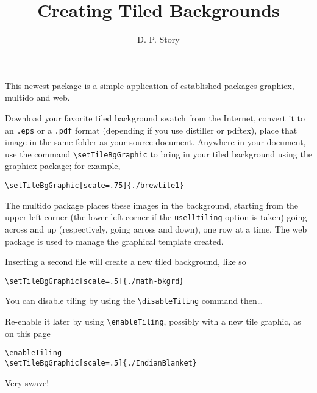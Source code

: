 \documentclass{article}
\title{Creating Tiled Backgrounds}
\author{D. P. Story}
\begin{document}
\maketitle


This newest package is a simple application of established packages
\textsf{graphicx}, \textsf{multido} and \textsf{web}.

Download your favorite tiled background swatch from the Internet,
convert it to an \texttt{.eps} or a \texttt{.pdf} format (depending
if you use \textsf{distiller} or \textsf{pdftex}), place that image
in the same folder as your source document. Anywhere in your
document, use the command \verb!\setTileBgGraphic! to bring in your
tiled background using the \textsf{graphicx} package; for example,
\begin{verbatim}
\setTileBgGraphic[scale=.75]{./brewtile1}
\end{verbatim}
The \textsf{multido} package places these images in the background,
starting from the upper-left corner (the lower left corner if the
\texttt{uselltiling} option is taken) going across and up
(respectively, going across and down), one row at a time. The web
package is used to manage the graphical template created.

\newpage


Inserting a second file will create a new tiled background, like so
\begin{verbatim}
\setTileBgGraphic[scale=.5]{./math-bkgrd}
\end{verbatim}


\newpage

\disableTiling

You can disable tiling by using the \verb!\disableTiling! command then\dots

\newpage

\enableTiling
{}

Re-enable it later by using \verb!\enableTiling!, possibly with a
new tile graphic, as on this page
\begin{verbatim}
\enableTiling
\setTileBgGraphic[scale=.5]{./IndianBlanket}
\end{verbatim}
Very swave!
\end{document}

